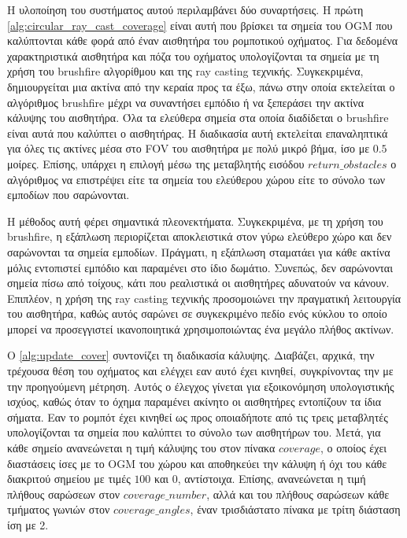 Η υλοποίηση του συστήματος αυτού περιλαμβάνει δύο συναρτήσεις. Η πρώτη \ref{alg:circular_ray_cast_coverage} είναι αυτή που βρίσκει τα σημεία του OGM που καλύπτονται κάθε φορά από έναν αισθητήρα του ρομποτικού οχήματος. Για δεδομένα χαρακτηριστικά αισθητήρα και πόζα του οχήματος υπολογίζονται τα σημεία με τη χρήση του brushfire αλγορίθμου και της ray casting τεχνικής. Συγκεκριμένα, δημιουργείται μια ακτίνα από την κεραία προς τα έξω, πάνω στην οποία εκτελείται ο αλγόριθμος brushfire μέχρι να συναντήσει εμπόδιο ή να ξεπεράσει την ακτίνα κάλυψης του αισθητήρα. Όλα τα ελεύθερα σημεία στα οποία διαδίδεται ο brushfire είναι αυτά που καλύπτει ο αισθητήρας. Η διαδικασία αυτή εκτελείται επαναληπτικά για όλες τις ακτίνες μέσα στο FOV του αισθητήρα με πολύ μικρό βήμα, ίσο με $0.5$ μοίρες. Επίσης, υπάρχει η επιλογή μέσω της μεταβλητής εισόδου $return\_obstacles$ ο αλγόριθμος να επιστρέψει είτε τα σημεία του ελεύθερου χώρου είτε το σύνολο των εμποδίων που σαρώνονται. 

Η μέθοδος αυτή φέρει σημαντικά πλεονεκτήματα. Συγκεκριμένα, με τη χρήση του brushfire, η εξάπλωση περιορίζεται αποκλειστικά στον γύρω ελεύθερο χώρο και δεν σαρώνονται τα σημεία εμποδίων. Πράγματι, η εξάπλωση σταματάει για κάθε ακτίνα μόλις εντοπιστεί εμπόδιο και παραμένει στο ίδιο δωμάτιο. Συνεπώς, δεν σαρώνονται σημεία πίσω από τοίχους, κάτι που ρεαλιστικά οι αισθητήρες αδυνατούν να κάνουν. Επιπλέον, η χρήση της ray casting τεχνικής προσομοιώνει την πραγματική λειτουργία του αισθητήρα, καθώς αυτός σαρώνει σε συγκεκριμένο πεδίο ενός κύκλου το οποίο μπορεί να προσεγγιστεί ικανοποιητικά χρησιμοποιώντας ένα μεγάλο πλήθος ακτίνων.

Ο \autoref{alg:update_cover} συντονίζει τη διαδικασία κάλυψης. Διαβάζει, αρχικά, την τρέχουσα θέση του οχήματος και ελέγχει εαν αυτό έχει κινηθεί, συγκρίνοντας την με την προηγούμενη μέτρηση. Αυτός ο έλεγχος γίνεται για εξοικονόμηση υπολογιστικής ισχύος, καθώς όταν το όχημα παραμένει ακίνητο οι αισθητήρες εντοπίζουν τα ίδια σήματα. Εαν το ρομπότ έχει κινηθεί ως προς οποιαδήποτε από τις τρεις μεταβλητές υπολογίζονται τα σημεία που καλύπτει το σύνολο των αισθητήρων του. Μετά, για κάθε σημείο ανανεώνεται η τιμή κάλυψης του στον πίνακα $coverage$, ο οποίος έχει διαστάσεις ίσες με το OGM του χώρου και αποθηκεύει την κάλυψη ή όχι του κάθε διακριτού σημείου με τιμές $100$ και $0$, αντίστοιχα. Επίσης, ανανεώνεται η τιμή πλήθους σαρώσεων στον $coverage\_number$, αλλά και του πλήθους σαρώσεων κάθε τμήματος γωνιών στον $coverage\_angles$, έναν τρισδιάστατο πίνακα με τρίτη διάσταση ίση με 2. 

